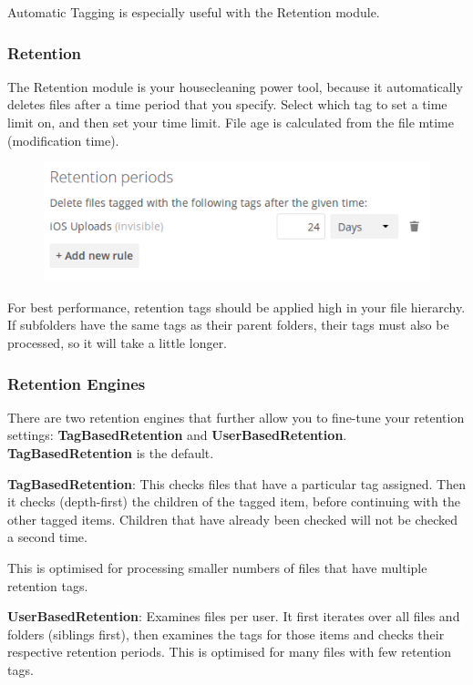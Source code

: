 \documentclass[letterpaper,10pt,english]{sphinxmanual}
\begin{document}
Automatic Tagging is especially useful with the Retention module.


\subsubsection{Retention}
\label{enterprise_file_management/files_tagging:retention}
The Retention module is your housecleaning power tool, because it automatically
deletes files after a time period that you specify. Select which tag to
set a time limit on, and then set your time limit. File age is calculated from
the file mtime (modification time).
\begin{figure}[htbp]
\centering

\includegraphics{workflow-4.png}
\end{figure}

For best performance, retention tags should be applied high in your file
hierarchy. If subfolders have the same tags as their parent folders, their tags
must also be processed, so it will take a little longer.


\subsubsection{Retention Engines}
\label{enterprise_file_management/files_tagging:retention-engines}
There are two retention engines that further allow you to fine-tune your
retention settings: \textbf{TagBasedRetention} and \textbf{UserBasedRetention}.
\textbf{TagBasedRetention} is the default.

\textbf{TagBasedRetention}: This checks files that have a particular tag
assigned. Then it checks (depth-first) the children of the tagged item, before
continuing with the other tagged items. Children that have already been checked
will not be checked a second time.

This is optimised for processing smaller numbers of files that have multiple
retention tags.

\textbf{UserBasedRetention}: Examines files per user. It first iterates over all
files and folders (siblings first), then examines the tags for those items and
checks their respective retention periods. This is optimised for many files with
few retention tags.
\end{document}

